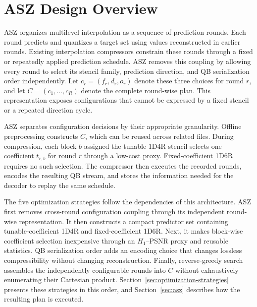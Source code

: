 \section{ASZ Design Overview}
\label{sec:overview}

ASZ organizes multilevel interpolation as a sequence of prediction rounds. Each round predicts and quantizes a target set using values reconstructed in earlier rounds. Existing interpolation compressors constrain these rounds through a fixed or repeatedly applied prediction schedule. ASZ removes this coupling by allowing every round to select its stencil family, prediction direction, and QB serialization order independently. Let $c_r=(f_r,d_r,o_r)$ denote these three choices for round $r$, and let $C=(c_1,\ldots,c_R)$ denote the complete round-wise plan. This representation exposes configurations that cannot be expressed by a fixed stencil or a repeated direction cycle.

ASZ separates configuration decisions by their appropriate granularity. Offline preprocessing constructs $C$, which can be reused across related files. During compression, each block $b$ assigned the tunable 1D4R stencil selects one coefficient $t_{r,b}$ for round $r$ through a low-cost proxy. Fixed-coefficient 1D6R requires no such selection. The compressor then executes the recorded rounds, encodes the resulting QB stream, and stores the information needed for the decoder to replay the same schedule.

The five optimization strategies follow the dependencies of this architecture. ASZ first removes cross-round configuration coupling through its independent round-wise representation. It then constructs a compact predictor set containing tunable-coefficient 1D4R and fixed-coefficient 1D6R. Next, it makes block-wise coefficient selection inexpensive through an $H_1$--PSNR proxy and reusable statistics. QB serialization order adds an encoding choice that changes lossless compressibility without changing reconstruction. Finally, reverse-greedy search assembles the independently configurable rounds into $C$ without exhaustively enumerating their Cartesian product. Section~\ref{sec:optimization-strategies} presents these strategies in this order, and Section~\ref{sec:asz} describes how the resulting plan is executed.
